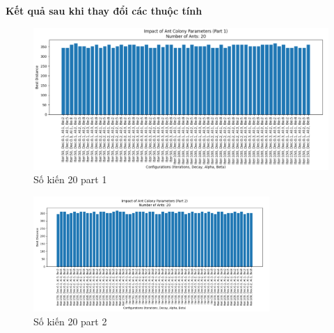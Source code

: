 \documentclass[14pt]{article}
\begin{document}
	\newpage
	\textbf{Kết quả sau khi thay đổi các thuộc tính}
	\begin{center}
		\begin{figure}[htbp]
			\centering
			\includegraphics[width=\textwidth]{./Image/20_part1.png}
			\caption{Số kiến 20 part 1}
			\label{fig:mylabel}
		\end{figure}
	
		\begin{figure}[htbp]
			\centering
			\includegraphics[width=0.8\textwidth]{./Image/20_part2.png}
			\caption{Số kiến 20 part 2}
			\label{fig:mylabel}
		\end{figure}
	

\end{center}
\end{document}
